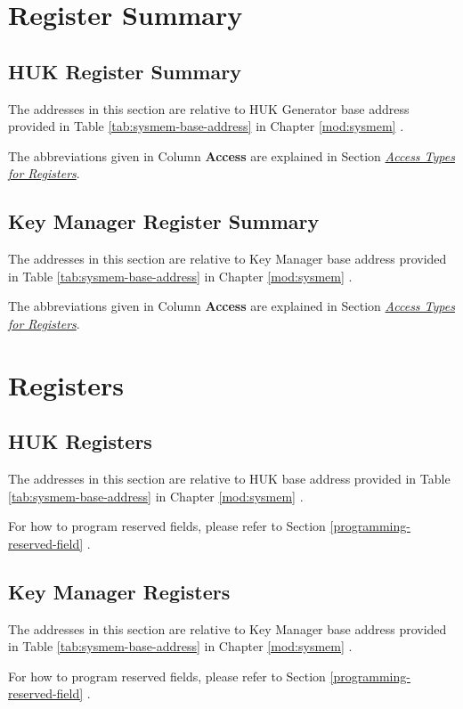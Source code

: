 \documentclass[main\_\_EN.tex]{subfiles}
\begin{document}

\newpage
\hypertarget{keymng-reg-summ}{}
\section{Register Summary}
\label{sec:keymng-reg-summ}

\subsection{HUK Register Summary}
The addresses in this section are relative to HUK Generator base address provided in Table \ref{tab:sysmem-base-address} in Chapter \ref{mod:sysmem} \textit{}.

The abbreviations given in Column \textbf{Access} are explained in Section \hyperref[glossary-access-types]{\textit{Access Types for Registers}}.


\subsection{Key Manager Register Summary}
The addresses in this section are relative to Key Manager base address provided in Table \ref{tab:sysmem-base-address} in Chapter \ref{mod:sysmem} \textit{}.

The abbreviations given in Column \textbf{Access} are explained in Section \hyperref[glossary-access-types]{\textit{Access Types for Registers}}.



\newpage
\section{Registers}

\subsection{HUK Registers}
The addresses in this section are relative to HUK base address provided in Table \ref{tab:sysmem-base-address} in Chapter \ref{mod:sysmem} \textit{}.

For how to program reserved fields, please refer to Section \ref{programming-reserved-field} \textit{}.



\subsection{Key Manager Registers}
The addresses in this section are relative to Key Manager base address provided in Table \ref{tab:sysmem-base-address} in Chapter \ref{mod:sysmem} \textit{}.

For how to program reserved fields, please refer to Section \ref{programming-reserved-field} \textit{}.

\end{document}
